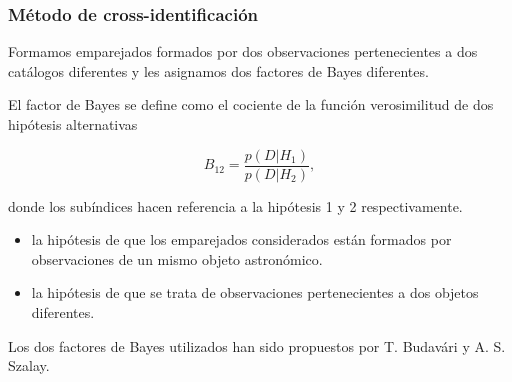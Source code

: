 \documentclass[8pt]{beamer}
\begin{document}
\begin{frame}

\frametitle{Método de cross-identificación}

Formamos emparejados formados por dos observaciones pertenecientes a dos catálogos diferentes y les asignamos dos factores de Bayes diferentes.

\vspace{2mm}

El factor de Bayes se define como el cociente de la función verosimilitud de dos hipótesis alternativas

\begin{equation*}
    B_{12}=\frac{p(D|H_1)}{p(D|H_2)},
\end{equation*}

donde los subíndices hacen referencia a la hipótesis 1 y 2 respectivamente.


\begin{itemize}

    \item {} la hipótesis de que los emparejados considerados están formados por observaciones de un mismo objeto astronómico.
    
    \item {} la hipótesis de que se trata de observaciones pertenecientes a dos objetos diferentes.
    
\end{itemize}
Los dos factores de Bayes utilizados han sido propuestos por T. Budavári y A. S. Szalay.

\end{frame}
\end{document}
